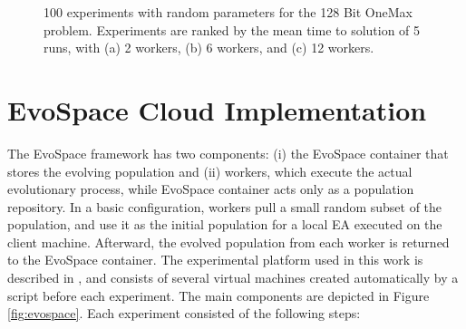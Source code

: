 \documentclass{llncs}
\begin{document}
\begin{figure}[t]
    \centering

    \caption{100 experiments with random parameters for the 128 Bit OneMax problem.
    Experiments are ranked by the mean time to solution of 5 runs, with   
    (a) 2 workers, (b) 6 workers, and (c) 12 workers.}
    \label{fig:effort}
\end{figure}


\section{EvoSpace Cloud Implementation}
\label{sec:evo}
The EvoSpace \cite{GValdez2015} framework has two components: (i) the EvoSpace 
container that stores the evolving population and (ii) workers, which execute 
the actual evolutionary process, while EvoSpace container acts only as a population repository.
In a basic configuration, workers pull a small random subset of the 
population, and use it as the initial population for a local EA executed 
on the client machine. Afterward, the evolved population from each worker 
is returned to the EvoSpace container. The experimental platform used in this work is
described in \cite{valenzuela2015implementing}, and consists of several virtual machines
created automatically by a script before each experiment. The main components are depicted
in Figure \ref{fig:evospace}. Each experiment consisted of the following steps:
\end{document}
